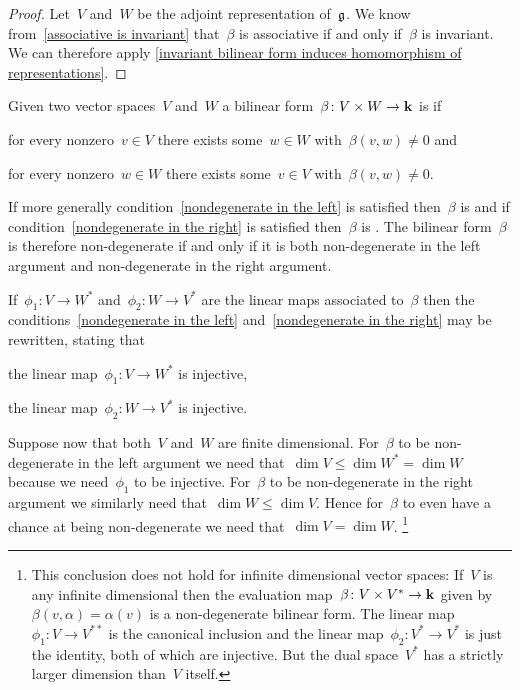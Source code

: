\begin{proof}
  Let~$V$ and~$W$ be the adjoint representation of~$\mathfrak{g}$.
  We know from~\cref{associative is invariant} that~$\beta$ is associative if and only if~$\beta$ is invariant.
  We can therefore apply \cref{invariant bilinear form induces homomorphism of representations}.
\end{proof}


\begin{recall}
  Given two vector spaces~$V$ and~$W$ a bilinear form~$\beta \colon V \times W \to \mathbf{k}$ is  if
  \begin{equivalenceslist}
    \item
      \label{nondegenerate in the left}
      for every nonzero~$v \in V$ there exists some~$w \in W$ with~$\beta(v,w) \neq 0$ and
    \item
      \label{nondegenerate in the right}
      for every nonzero~$w \in W$ there exists some~$v \in V$ with~$\beta(v,w) \neq 0$.
  \end{equivalenceslist}
  If more generally condition~\ref*{nondegenerate in the left} is satisfied then~$\beta$ is  and if condition~\ref*{nondegenerate in the right} is satisfied then~$\beta$ is .
  The bilinear form~$\beta$ is therefore non-degenerate if and only if it is both non-degenerate in the left argument and non-degenerate in the right argument.
  
  If~$\phi_1 \colon V \to W^*$ and~$\phi_2 \colon W \to V^*$ are the linear maps associated to~$\beta$ then the conditions~\ref*{nondegenerate in the left} and~\ref*{nondegenerate in the right} may be rewritten, stating that
  \begin{equivalenceslist}[label = \roman*')]
    \item
      the linear map~$\phi_1 \colon V \to W^*$ is injective,
    \item
      the linear map~$\phi_2 \colon W \to V^*$ is injective.
  \end{equivalenceslist}
  
  Suppose now that both~$V$ and~$W$ are finite dimensional.
  For~$\beta$ to be non-degenerate in the left argument we need that~$\dim V \leq \dim W^* = \dim W$ because we need~$\phi_1$ to be injective.
  For~$\beta$ to be non-degenerate in the right argument we similarly need that~$\dim W \leq \dim V$.
  Hence for~$\beta$ to even have a chance at being non-degenerate we need that~$\dim V = \dim W$.%
  \footnote{
  This conclusion does not hold for infinite dimensional vector spaces:
  If~$V$ is any infinite dimensional then the evaluation map~$\beta \colon V \times V^* \to \mathbf{k}$ given by~$\beta(v,\alpha) = \alpha(v)$ is a non-degenerate bilinear form.
  The linear map~$\phi_1 \colon V \to V^{**}$ is the canonical inclusion and the linear map~$\phi_2 \colon V^* \to V^*$ is just the identity, both of which are injective.
  But the dual space~$V^*$ has a strictly larger dimension than~$V$ itself.}
  

\end{recall}

